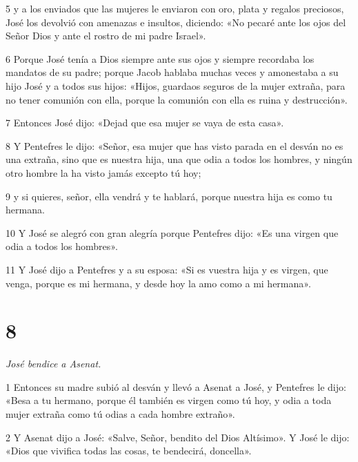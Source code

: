 \par 5 y a los enviados que las mujeres le enviaron con oro, plata y regalos preciosos, José los devolvió con amenazas e insultos, diciendo: «No pecaré ante los ojos del Señor Dios y ante el rostro de mi padre Israel».

\par 6 Porque José tenía a Dios siempre ante sus ojos y siempre recordaba los mandatos de su padre; porque Jacob hablaba muchas veces y amonestaba a su hijo José y a todos sus hijos: «Hijos, guardaos seguros de la mujer extraña, para no tener comunión con ella, porque la comunión con ella es ruina y destrucción».

\par 7 Entonces José dijo: «Dejad que esa mujer se vaya de esta casa».

\par 8 Y Pentefres le dijo: «Señor, esa mujer que has visto parada en el desván no es una extraña, sino que es nuestra hija, una que odia a todos los hombres, y ningún otro hombre la ha visto jamás excepto tú hoy;

\par 9 y si quieres, señor, ella vendrá y te hablará, porque nuestra hija es como tu hermana.

\par 10 Y José se alegró con gran alegría porque Pentefres dijo: «Es una virgen que odia a todos los hombres».

\par 11 Y José dijo a Pentefres y a su esposa: «Si es vuestra hija y es virgen, que venga, porque es mi hermana, y desde hoy la amo como a mi hermana».

\chapter{8}


\par \textit{José bendice a Asenat.}

\par 1 Entonces su madre subió al desván y llevó a Asenat a José, y Pentefres le dijo: «Besa a tu hermano, porque él también es virgen como tú hoy, y odia a toda mujer extraña como tú odias a cada hombre extraño».

\par 2 Y Asenat dijo a José: «Salve, Señor, bendito del Dios Altísimo». Y José le dijo: «Dios que vivifica todas las cosas, te bendecirá, doncella».


